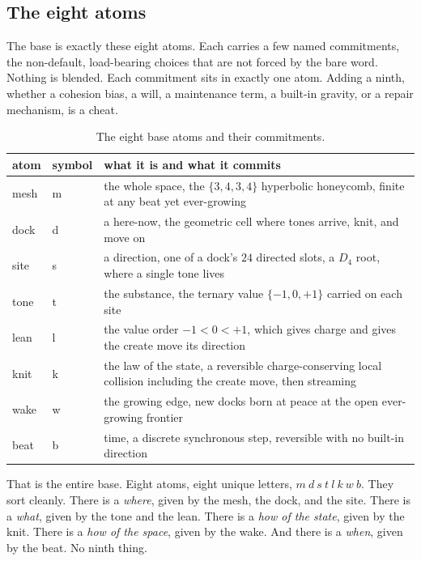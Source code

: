 \subsection{The eight atoms}

The base is exactly these eight atoms. Each carries a few named commitments, the non-default, load-bearing choices that are not forced by the bare word. Nothing is blended. Each commitment sits in exactly one atom. Adding a ninth, whether a cohesion bias, a will, a maintenance term, a built-in gravity, or a repair mechanism, is a cheat.

\begin{table}[ht]
\centering
\begin{tabular}{@{}llp{}@{}}
\toprule
atom & symbol & what it is and what it commits \\
\midrule
mesh & m & the whole space, the $\{3,4,3,4\}$ hyperbolic honeycomb, finite at any beat yet ever-growing \\
dock & d & a here-now, the geometric cell where tones arrive, knit, and move on \\
site & s & a direction, one of a dock's $24$ directed slots, a $D_4$ root, where a single tone lives \\
tone & t & the substance, the ternary value $\{-1, 0, +1\}$ carried on each site \\
lean & l & the value order $-1 < 0 < +1$, which gives charge and gives the create move its direction \\
knit & k & the law of the state, a reversible charge-conserving local collision including the create move, then streaming \\
wake & w & the growing edge, new docks born at peace at the open ever-growing frontier \\
beat & b & time, a discrete synchronous step, reversible with no built-in direction \\
\bottomrule
\end{tabular}
\caption{The eight base atoms and their commitments.}
\label{tab:base-atoms}
\end{table}

That is the entire base. Eight atoms, eight unique letters, $m\ d\ s\ t\ l\ k\ w\ b$. They sort cleanly. There is a \emph{where}, given by the mesh, the dock, and the site. There is a \emph{what}, given by the tone and the lean. There is a \emph{how of the state}, given by the knit. There is a \emph{how of the space}, given by the wake. And there is a \emph{when}, given by the beat. No ninth thing.

